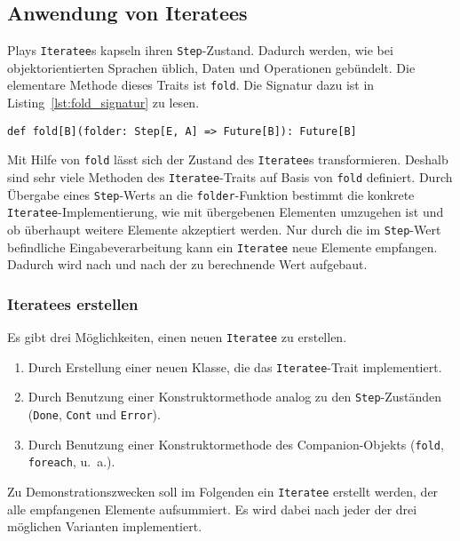 

\subsection{Anwendung von Iteratees} %
\label{sub:iteratees}

Plays \lstinline|Iteratee|s kapseln ihren \lstinline|Step|-Zustand.
Dadurch werden, wie bei objektorientierten Sprachen üblich, Daten und Operationen gebündelt.
Die elementare Methode dieses Traits ist \lstinline|fold|.
Die Signatur dazu ist in Listing~\ref{lst:fold_signatur} zu lesen.
\begin{lstlisting}[caption=Die Signatur von fold, label=lst:fold_signatur]
def fold[B](folder: Step[E, A] => Future[B]): Future[B]
\end{lstlisting}

Mit Hilfe von \lstinline|fold| lässt sich der Zustand des \lstinline|Iteratee|s transformieren.
Deshalb sind sehr viele Methoden des \lstinline|Iteratee|-Traits auf Basis von \lstinline|fold| definiert.
Durch Übergabe eines \lstinline|Step|-Werts an die \lstinline|folder|-Funktion bestimmt die konkrete \lstinline|Iteratee|-Implementierung, wie mit übergebenen Elementen umzugehen ist und ob überhaupt weitere Elemente akzeptiert werden.
Nur durch die im \lstinline|Step|-Wert befindliche Eingabeverarbeitung kann ein \lstinline|Iteratee| neue Elemente empfangen.
Dadurch wird nach und nach der zu berechnende Wert aufgebaut.

\subsubsection{Iteratees erstellen} %
\label{ssub:iteratees_erstellen}

Es gibt drei Möglichkeiten, einen neuen \lstinline|Iteratee| zu erstellen.
\begin{enumerate}
  \item Durch Erstellung einer neuen Klasse, die das \lstinline|Iteratee|-Trait implementiert.
  \item Durch Benutzung einer Konstruktormethode analog zu den \lstinline|Step|-Zuständen (\lstinline|Done|, \lstinline|Cont| und \lstinline|Error|).
  \item Durch Benutzung einer Konstruktormethode des Companion-Objekts (\lstinline|fold|, \lstinline|foreach|, u.~a.).
\end{enumerate}

Zu Demonstrationszwecken soll im Folgenden ein \lstinline|Iteratee| erstellt werden, der alle empfangenen Elemente aufsummiert.
Es wird dabei nach jeder der drei möglichen Varianten implementiert.

